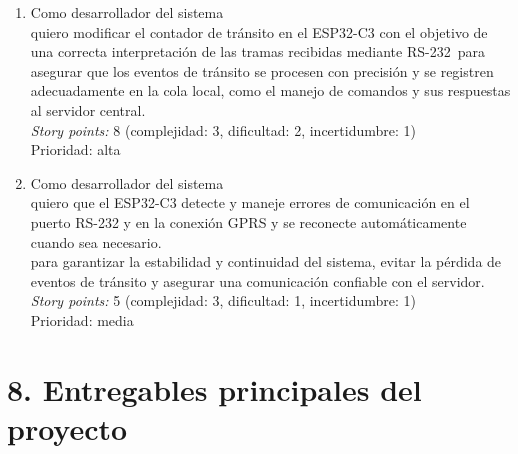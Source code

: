 \documentclass[
11pt, %
]{charter}
\begin{document}
\begin{enumerate}
\item 
Como desarrollador del sistema\\
quiero modificar el contador de tránsito en el ESP32-C3 con el objetivo de una correcta interpretación de las tramas recibidas mediante RS-232\
para asegurar que los eventos de tránsito se procesen con precisión y se registren adecuadamente en la cola local, como el manejo de comandos y sus respuestas al servidor central.\\
\textit{Story points:} 8 (complejidad: 3, dificultad: 2, incertidumbre: 1)\\
Prioridad: alta

\item
Como desarrollador del sistema\\
quiero que el ESP32-C3 detecte y maneje errores de comunicación en el puerto RS-232 y en la conexión GPRS y se reconecte automáticamente cuando sea necesario.\\
para garantizar la estabilidad y continuidad del sistema, evitar la pérdida de eventos de tránsito y asegurar una comunicación confiable con el servidor.\\
\textit{Story points:} 5 (complejidad: 3, dificultad: 1, incertidumbre: 1)\\
Prioridad: media

\end{enumerate}

\section{8. Entregables principales del proyecto}
\label{sec:entregables}
\end{document}
